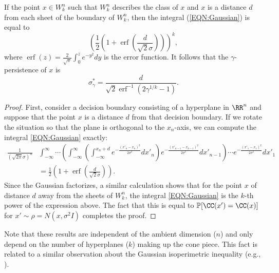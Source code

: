 \begin{proposition} \label{prop:orthants}
    If the point $x \in W^n_k$ such that $W^n_k$ describes the class of $x$ and $x$ is a distance $d$ from each sheet of the boundary of $W^n_k$, then the integral (\ref{EQN:Gaussian}) is equal to
\[
    \left( \frac{1}{2}\left(  1+\operatorname{erf}\left(  \frac{d}{\sqrt
    {2}\sigma}\right)  \right) \right)^k,
\]
    where $\operatorname{erf}(z)=\frac{2}{\sqrt{\pi}}\int_0^z e^{-y^2}dy$ is the error function.
    It follows that the $\gamma$-persistence of $x$ is
\[
    \sigma_\gamma^* = \frac{d}{\sqrt{2}\operatorname{erf}^{-1} \left( 2 \gamma^{1/k} -1\right)}.
\]
\end{proposition}

\begin{proof}
First, consider a decision boundary consisting of a hyperplane in $\RR^n$
and suppose that the point $x$ is a distance $d$ from that decision boundary. If we rotate the situation so that the plane is orthogonal to the $x_{n}$-axis, we can compute the integral \eqref{EQN:Gaussian} exactly:
\begin{align*}
\frac{1}{\left(\sqrt{2\pi}\sigma\right)^{n}}& \int_{-\infty}^{\infty} \cdots \left( \int_{-\infty}^{\infty}\left( \int_{-\infty}^{x_n+d} e^{-\frac{\left(  x'_n-x_n\right)  ^{2}}{2\sigma^2}
}dx'_n \right)e^{-\frac{\left(  x'_{n-1}-x_{n-1}\right)  ^{2}}{2\sigma^2}} dx'_{n-1}\right) \cdots e^{-\frac{\left(  x'_{1}-x_{1}\right)  ^{2}}{2\sigma^2}} dx'_{1}
\\
&=\frac{1}{2}\left(  1+\operatorname{erf}\left(  \frac{d}{\sqrt
{2}\sigma}\right)  \right).
\end{align*}
Since the Gaussian factorizes, a similar calculation shows that for the point $x$ of distance $d$ away from the sheets of $W_k^n$, the integral \eqref{EQN:Gaussian} is the $k$-th power of the expression above. The fact that this is equal to $\mathbb{P}[\CC(x')=\CC(x)]$ for $x' \sim \rho = N(x, \sigma^2 I)$ completes the proof.
\end{proof}


Note that these results are independent of the ambient dimension ($n$) and only depend on the number of hyperplanes ($k$) making up the cone piece. This fact is related to a similar observation about the Gaussian isoperimetric inequality (e.g., \cite{ledoux1996isoperimetry}).

